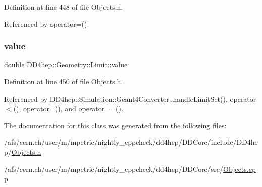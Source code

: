 Definition at line 448 of file Objects.\+h.



Referenced by operator=().

\hypertarget{class_d_d4hep_1_1_geometry_1_1_limit_af3c5aac5f2991f137749634caf9e49cc}{}\label{class_d_d4hep_1_1_geometry_1_1_limit_af3c5aac5f2991f137749634caf9e49cc} 
\subsubsection{\texorpdfstring{value}{value}}
{\footnotesize\ttfamily double D\+D4hep\+::\+Geometry\+::\+Limit\+::value}



Definition at line 450 of file Objects.\+h.



Referenced by D\+D4hep\+::\+Simulation\+::\+Geant4\+Converter\+::handle\+Limit\+Set(), operator$<$(), operator=(), and operator==().



The documentation for this class was generated from the following files\+:\begin{DoxyCompactItemize}
\item 
/afs/cern.\+ch/user/m/mpetric/nightly\+\_\+cppcheck/dd4hep/\+D\+D\+Core/include/\+D\+D4hep/\hyperlink{_objects_8h}{Objects.\+h}\item 
/afs/cern.\+ch/user/m/mpetric/nightly\+\_\+cppcheck/dd4hep/\+D\+D\+Core/src/\hyperlink{_objects_8cpp}{Objects.\+cpp}\end{DoxyCompactItemize}
